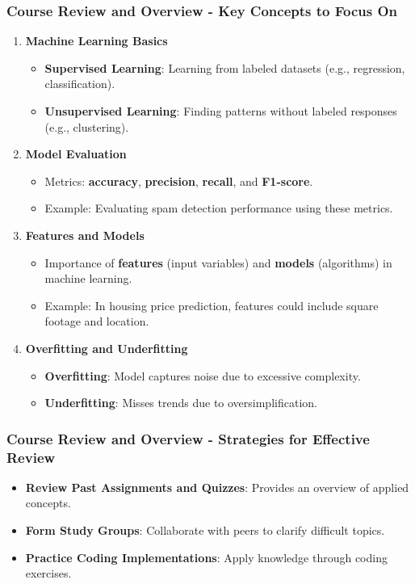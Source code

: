 \documentclass[aspectratio=169]{beamer}
\begin{document}
\begin{frame}[fragile]
    \frametitle{Course Review and Overview - Key Concepts to Focus On}
    \begin{enumerate}
        \item \textbf{Machine Learning Basics}
        \begin{itemize}
            \item \textbf{Supervised Learning}: Learning from labeled datasets (e.g., regression, classification).
            \item \textbf{Unsupervised Learning}: Finding patterns without labeled responses (e.g., clustering).
        \end{itemize}
        
        \item \textbf{Model Evaluation}
        \begin{itemize}
            \item Metrics: \textbf{accuracy}, \textbf{precision}, \textbf{recall}, and \textbf{F1-score}.
            \item Example: Evaluating spam detection performance using these metrics.
        \end{itemize}

        \item \textbf{Features and Models}
        \begin{itemize}
            \item Importance of \textbf{features} (input variables) and \textbf{models} (algorithms) in machine learning.
            \item Example: In housing price prediction, features could include square footage and location.
        \end{itemize}
        
        \item \textbf{Overfitting and Underfitting}
        \begin{itemize}
            \item \textbf{Overfitting}: Model captures noise due to excessive complexity.
            \item \textbf{Underfitting}: Misses trends due to oversimplification.
        \end{itemize}
    \end{enumerate}
\end{frame}

\begin{frame}[fragile]
    \frametitle{Course Review and Overview - Strategies for Effective Review}
    \begin{itemize}
        \item \textbf{Review Past Assignments and Quizzes}: Provides an overview of applied concepts.
        \item \textbf{Form Study Groups}: Collaborate with peers to clarify difficult topics.
        \item \textbf{Practice Coding Implementations}: Apply knowledge through coding exercises.
    \end{itemize}
\end{frame}
\end{document}
